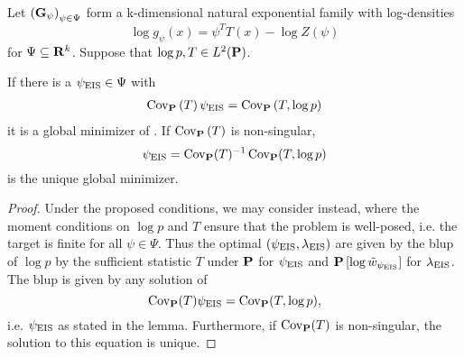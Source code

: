 \begin{lemma}
    \label{prop:eis_exponential_families}
    Let $\left( \G_{\psi} \right)_{\psi \in \Psi}$ form a k-dimensional natural exponential family with log-densities 
    $$
        \log g_{\psi}(x) = \psi^{T} T(x) - \log Z(\psi)
    $$
    for $\Psi \subseteq \R^{k}$. Suppose that $\log p, T \in L^{2}(\P)$. 

    If there is a $\peis \in \Psi$ with
    \begin{align}
        \label{eq:peis-analytical}
        \cov_{\P} \left( T \right)\peis = \cov_{\P} \left(T, \log p \right)
    \end{align}
    it is a global minimizer of . If $\cov_{\P} \left( T \right)$ is non-singular,
    $$
    \peis = \cov_{\P} (T) ^{-1} \cov _{\P} (T, \log p )
    $$
    is the unique global minimizer.
\end{lemma}

\begin{proof}
    Under the proposed conditions, we may consider  instead, where the moment conditions on $\log p $ and $T$ ensure that the problem is well-posed, i.e. the target is finite for all $\psi \in \Psi$. 
    Thus the optimal $ \left( \peis, \lambda_{\eis} \right)$ are given by the \gls{blup} of $\log p $ by the sufficient statistic $T$ under $\P$ for $\peis$ and $\P \left[ \log \tilde w_{\peis} \right]$ for $\lambda_{\eis}$. The \acrshort{blup} is given by any solution of
    $$
        \cov_{\P} (T) \peis = \cov_{\P} (T, \log p),
    $$
    i.e. $\peis$ as stated in the lemma. Furthermore, if $\cov_{\P} (T)$ is non-singular, the solution to this equation is unique.
    
\end{proof}

